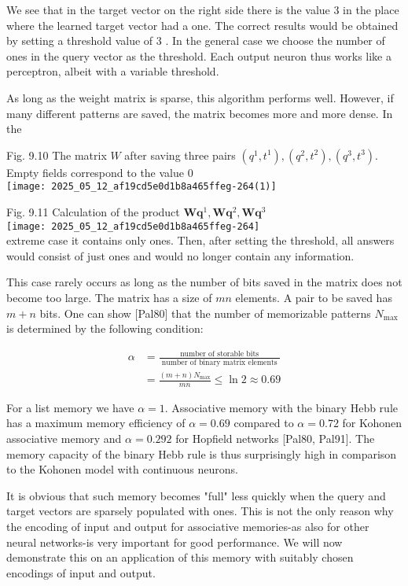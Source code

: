 \documentclass[10pt]{article}
\begin{document}
We see that in the target vector on the right side there is the value 3 in the place where the learned target vector had a one. The correct results would be obtained by setting a threshold value of 3 . In the general case we choose the number of ones in the query vector as the threshold. Each output neuron thus works like a perceptron, albeit with a variable threshold.

As long as the weight matrix is sparse, this algorithm performs well. However, if many different patterns are saved, the matrix becomes more and more dense. In the

Fig. 9.10 The matrix $W$ after saving three pairs $\left(q^{1}, t^{1}\right),\left(q^{2}, t^{2}\right),\left(q^{3}, t^{3}\right)$. Empty fields correspond to the value 0\\
\texttt{[image: 2025\_05\_12\_af19cd5e0d1b8a465ffeg-264(1)]}

Fig. 9.11 Calculation of the product $\boldsymbol{W} \boldsymbol{q}^{1}, \boldsymbol{W} \boldsymbol{q}^{2}, \boldsymbol{W} \boldsymbol{q}^{3}$\\
\texttt{[image: 2025\_05\_12\_af19cd5e0d1b8a465ffeg-264]}\\
extreme case it contains only ones. Then, after setting the threshold, all answers would consist of just ones and would no longer contain any information.

This case rarely occurs as long as the number of bits saved in the matrix does not become too large. The matrix has a size of $m n$ elements. A pair to be saved has $m+n$ bits. One can show [Pal80] that the number of memorizable patterns $N_{\text {max }}$ is determined by the following condition:


\begin{align*}
\alpha & =\frac{\text { number of storable bits }}{\text { number of binary matrix elements }}  \tag{9.11}\\
& =\frac{(m+n) N_{\max }}{m n} \leq \ln 2 \approx 0.69
\end{align*}


For a list memory we have $\alpha=1$. Associative memory with the binary Hebb rule has a maximum memory efficiency of $\alpha=0.69$ compared to $\alpha=0.72$ for Kohonen associative memory and $\alpha=0.292$ for Hopfield networks [Pal80, Pal91]. The memory capacity of the binary Hebb rule is thus surprisingly high in comparison to the Kohonen model with continuous neurons.

It is obvious that such memory becomes "full" less quickly when the query and target vectors are sparsely populated with ones. This is not the only reason why the encoding of input and output for associative memories-as also for other neural networks-is very important for good performance. We will now demonstrate this on an application of this memory with suitably chosen encodings of input and output.
\end{document}
